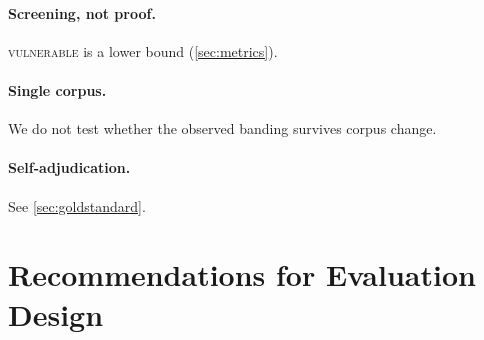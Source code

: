 \documentclass[11pt]{article}
\newcommand{\vuln}{\textsc{vulnerable}}
\begin{document}
\paragraph{Screening, not proof.} \vuln{} is a lower bound
(\cref{sec:metrics}).

\paragraph{Single corpus.} We do not test whether the observed banding
survives corpus change.

\paragraph{Self-adjudication.} See \cref{sec:goldstandard}.

\section{Recommendations for Evaluation Design}
\end{document}

